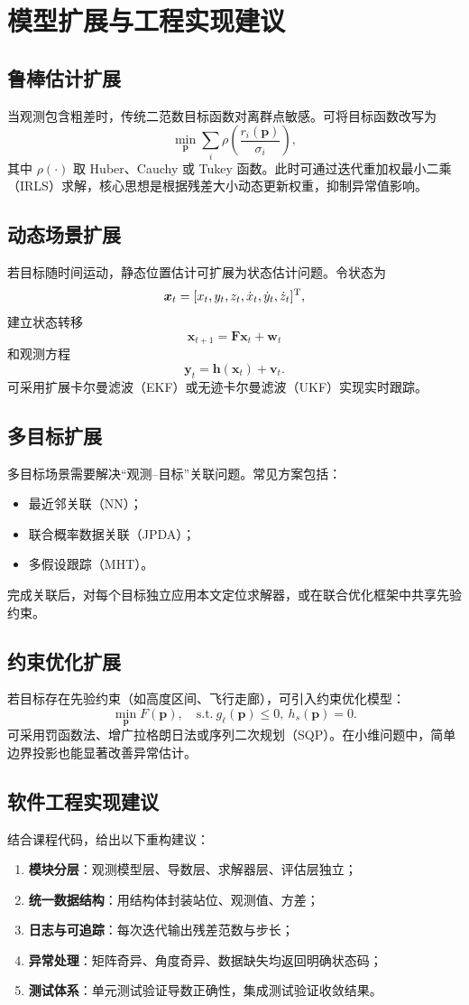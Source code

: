 \chapter{模型扩展与工程实现建议}

\section{鲁棒估计扩展}
当观测包含粗差时，传统二范数目标函数对离群点敏感。可将目标函数改写为
\[
\min_{\bm p}\sum_i \rho\!\left(\frac{r_i(\bm p)}{\sigma_i}\right),
\]
其中 $\rho(\cdot)$ 取 Huber、Cauchy 或 Tukey 函数。此时可通过迭代重加权最小二乘（IRLS）求解，核心思想是根据残差大小动态更新权重，抑制异常值影响。

\section{动态场景扩展}
若目标随时间运动，静态位置估计可扩展为状态估计问题。令状态为
\[
\bm x_t=[x_t,y_t,z_t,\dot x_t,\dot y_t,\dot z_t]^{\mathrm{T}},
\]
建立状态转移
\[
\bm x_{t+1}=\bm F\bm x_t+\bm w_t
\]
和观测方程
\[
\bm y_t=\bm h(\bm x_t)+\bm v_t.
\]
可采用扩展卡尔曼滤波（EKF）或无迹卡尔曼滤波（UKF）实现实时跟踪。

\section{多目标扩展}
多目标场景需要解决“观测--目标”关联问题。常见方案包括：
\begin{itemize}
  \item 最近邻关联（NN）；
  \item 联合概率数据关联（JPDA）；
  \item 多假设跟踪（MHT）。
\end{itemize}
完成关联后，对每个目标独立应用本文定位求解器，或在联合优化框架中共享先验约束。

\section{约束优化扩展}
若目标存在先验约束（如高度区间、飞行走廊），可引入约束优化模型：
\[
\min_{\bm p} F(\bm p),\quad
\text{s.t.}\ g_\ell(\bm p)\le 0,\ h_s(\bm p)=0.
\]
可采用罚函数法、增广拉格朗日法或序列二次规划（SQP）。在小维问题中，简单边界投影也能显著改善异常估计。

\section{软件工程实现建议}
结合课程代码，给出以下重构建议：
\begin{enumerate}
  \item \textbf{模块分层}：观测模型层、导数层、求解器层、评估层独立；
  \item \textbf{统一数据结构}：用结构体封装站位、观测值、方差；
  \item \textbf{日志与可追踪}：每次迭代输出残差范数与步长；
  \item \textbf{异常处理}：矩阵奇异、角度奇异、数据缺失均返回明确状态码；
  \item \textbf{测试体系}：单元测试验证导数正确性，集成测试验证收敛结果。
\end{enumerate}

